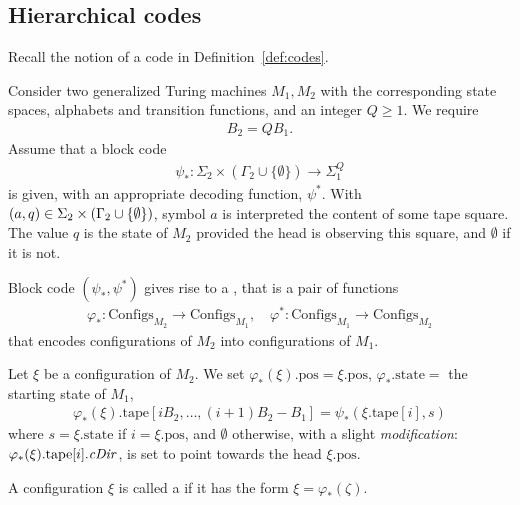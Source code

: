 \documentclass[12pt]{memoir}
\renewcommand{\ge}{\geq}
\newcommand{\fld}[1]{\ensuremath{\textit{#1\/}}}
\def\B{B}
\newcommand{\Configs}{\mathrm{Configs}}
\newcommand{\pos}{\mathrm{pos}}
\newcommand{\cDir}{\fld{cDir}}
\newcommand{\state}{\mathrm{state}}
\newcommand{\tape}{\mathrm{tape}}
\begin{document}
\subsection{Hierarchical codes}\label{sec:hier-codes}

Recall the notion of a code in Definition~\ref{def:codes}.

\begin{definition}\label{def:configuration-code}
Consider two generalized Turing machines \( M_{1},M_{2} \) with the corresponding
state spaces, alphabets and transition functions, and an integer \( Q\ge 1 \).
We require
\begin{align}\label{eq:B_2-B_1-Q}
  \B_{2} = Q \B_{1}.
\end{align}
Assume that a block code
\begin{align*}
   \psi_{*}:\Sigma_{2}\times(\Gamma_{2}\cup\{\emptyset\})\to\Sigma_{1}^{Q}
 \end{align*}
is given, with an appropriate decoding function, \( \psi^{*} \).
With \( (a,q)\in\Sigma_{2}\times(\Gamma_{2}\cup\{\emptyset\}) \),
symbol \( a \) is interpreted the content of some tape square.
The value \( q \) is the state of \( M_{2} \) provided the head is observing this square,
and \( \emptyset \) if it is not.

Block code \( (\psi_{*},\psi^{*}) \) gives rise to a 
, that is a pair of functions
    \begin{align*}
        \varphi_{*} :\Configs_{M_2} \to \Configs_{M_1},
        \quad
        \varphi^{*}:\Configs_{M_1} \to \Configs_{M_2}
    \end{align*}
    that encodes configurations of \( M_2 \) into configurations of \( M_{1} \).

Let \( \xi \) be a configuration of \( M_2 \).
We set \( \varphi_*(\xi).\pos = \xi.\pos \), \(\varphi_{*}.\state=  \) 
the starting state of \( M_{1} \),
\begin{align*}
 \varphi_*(\xi).\tape[i\B_2, \dots, (i+1)\B_2 - \B_1] = \psi_*(\xi.\tape[i], s)
 \end{align*}
where \( s=\xi.\state \) if \( i = \xi.\pos \), and \( \emptyset \) otherwise, with
a slight \emph{modification}: 
\( \varphi_{*}(\xi).\tape[i].\cDir \), is set to point towards the head \( \xi.\pos \).

A configuration \( \xi \) is called a  if 
it has the form \( \xi=\varphi_{*}(\zeta) \).
 \end{definition}
\end{document}
